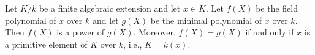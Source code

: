 Let $K/k$ be a finite algebraic extension and let $x \in K$. Let $f(X)$ be the field polynomial of $x$ over $k$ and let $g(X)$ be the minimal polynomial of $x$ over $k$. Then $f(X)$ is a power of $g(X)$. Moreover, $f(X) = g(X)$ if and only if $x$ is a primitive element of $K$ over $k$, i.e., $K = k(x)$.
